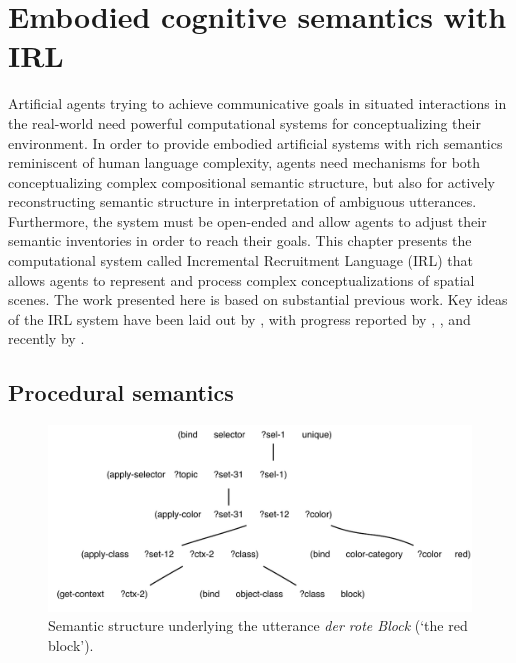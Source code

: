 %

\chapter{Embodied cognitive semantics with IRL}
\label{s:irl}
Artificial agents trying to achieve communicative goals in situated interactions
in the real-world need powerful computational systems for conceptualizing 
their environment. In order to provide 
embodied artificial systems with rich semantics reminiscent of human 
language complexity, agents need mechanisms for both conceptualizing complex 
compositional semantic structure, but also for 
actively reconstructing semantic 
structure in interpretation of ambiguous utterances.
Furthermore, the system must be open-ended and 
allow agents to adjust their semantic inventories in order to reach their goals. 
This chapter presents the computational system called
Incremental Recruitment Language (IRL) 
that allows agents to represent and process complex conceptualizations
of spatial scenes. The work presented here is based on substantial previous work. 
Key ideas of the IRL system have been laid out by \cite{steels2000emergence}, 
with progress reported by \cite{steels2005planning}, \cite{vandenbroeck2008irl}, and
recently by \cite{spranger2010irl,spranger2012irl}.

\section{Procedural semantics}
\label{s:grounded-procedural-semantics}
\begin{figure}
\center
\includegraphics[width=.8\textwidth]{figs/the-red-block-network}
\caption{Semantic structure underlying the utterance \textit{der rote Block} (`the red block').}
\label{f:the-red-block-network}
\end{figure}

